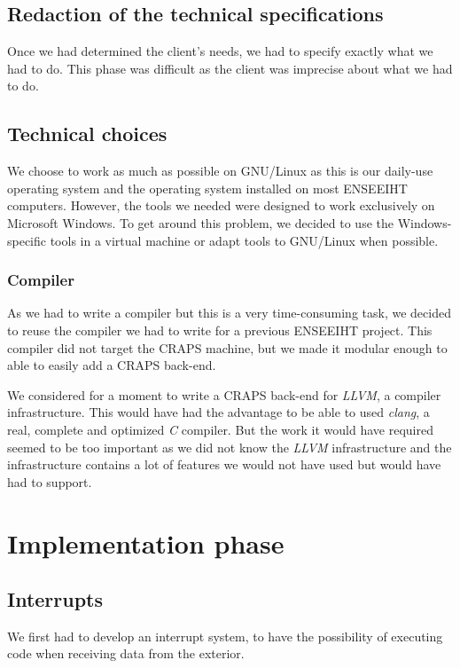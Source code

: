 \documentclass[openany, a4paper]{book}
\begin{document}
    \section{Redaction of the technical specifications}
      Once we had determined the client's needs, we had to specify exactly what
      we had to do. This phase was difficult as the client was imprecise about
      what we had to do.

    \section{Technical choices}
      We choose to work as much as possible on GNU/Linux as this is our
      daily-use operating system and the operating system installed on most
      ENSEEIHT computers.
      However, the tools we needed were designed to work exclusively on
      Microsoft Windows. To get around this problem, we decided to use the
      Windows-specific tools in a virtual machine or adapt tools to GNU/Linux
      when possible.

      \subsection{Compiler}
        As we had to write a compiler but this is a very time-consuming task, we
        decided to reuse the compiler we had to write for a previous ENSEEIHT
        project. This compiler did not target the CRAPS machine, but we made it
        modular enough to able to easily add a CRAPS back-end.

        We considered for a moment to write a CRAPS back-end for \emph{LLVM}, a
        compiler infrastructure\cite{llvm}. This would have had the advantage to
        be able to used \emph{clang}, a real, complete and optimized
        \emph{C} compiler. But the work it would have required seemed to be too
        important as we did not know the \emph{LLVM} infrastructure and the
        infrastructure contains a lot of features we would not have used but
        would have had to support.

  \chapter{Implementation phase}
    \section{Interrupts}
      We first had to develop an interrupt system, to have the possibility of
      executing code when receiving data from the exterior.
\end{document}
